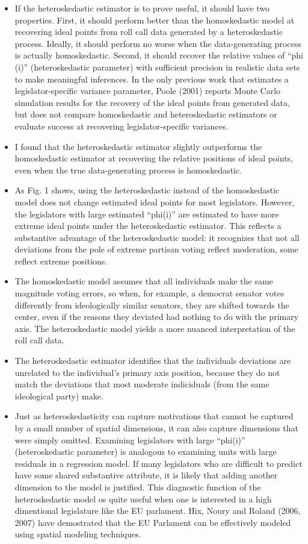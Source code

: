 \documentclass[a4paper,12pt]{article}
\begin{document}
\begin{enumerate}
\begin{itemize}
\item If the heteroskedastic estimator is to prove useful, it should have two properties. First, it should perform better than the homoskedastic model at recovering ideal points from roll call data generated by a heteroskedastic process. Ideally, it should perform no worse when the data-generating process is actually homoskedastic. Second, it should recover the relative values of “phi (i)” (heteroskedastic parameter) with sufficient precision in realistic data sets to make meaningful inferences. In the only previous work that estimates a legislator-specific variance parameter, Poole (2001) reports Monte Carlo simulation results for the recovery of the ideal points from generated data, but does not compare homoskedastic and heteroskedastic estimators or evaluate success at recovering legislator-specific variances.
\item I found that the heteroskedastic estimator slightly outperforms the homoskedastic estimator at recovering the relative positions of ideal points, even when the true data-generating process is homoskedastic. 
\item As Fig. 1 shows, using the heteroskedastic instead of the homoskedastic model does not change estimated ideal points for most legislators. However, the legislators with large estimated “phi(i)” are estimated to have more extreme ideal points under the heteroskedastic estimator. This reflects a substantive advantage of the heteroskedastic model: it recognizes that not all deviations from the pole of extreme partisan voting reflect moderation, some reflect extreme positions. 
\item The homoskedastic model assumes that all individuals make the same magnitude voting errors, so when, for example, a democrat senator votes differently from ideologically similar senators, they are shifted towards the center, even if the reasons they deviated had nothing to do with the primary axis. The heteroskedastic model yields a more nuanced interpretation of the roll call data. 
\item The heteroskedastic estimator identifies that the individuals deviations are unrelated to the individual's primary axis position, because they do not match the deviations that most moderate indiciduals (from the same ideological party) make.
\item Just as heteroskedasticity can capture motivations that cannot be captured by a small number of spatial dimensions, it can also capture dimensions that were simply omitted. Examining legislators with large “phi(i)” (heteroskedastic parameter) is analogous to examining units with large residuals in a regression model. If many legislators who are difficult to predict have some shared substantive attribute, it is likely that adding another dimension to the model is justified. This diagnostic function of the heteroskedastic model os quite useful when one is interested in a high dimentional legislature like the EU parlament. Hix, Noury and Roland (2006, 2007) have demostrated that the EU Parlament can be effectively modeled using spatial modeling techniques. 
\end{itemize}



\end{enumerate}
\end{document}
